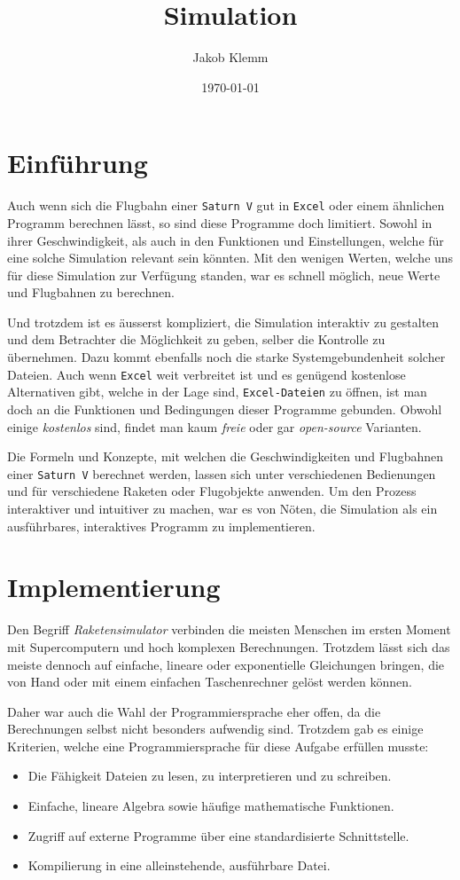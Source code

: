 \documentclass[11pt]{article}
\author{Jakob Klemm}
\date{\today}
\title{Simulation}
\begin{document}
\maketitle
\tableofcontents

\section{Einführung}
\label{sec:org278b65d}
Auch wenn sich die Flugbahn einer \texttt{Saturn V} gut in \texttt{Excel} oder einem ähnlichen
Programm berechnen lässt, so sind diese Programme doch limitiert. Sowohl in
ihrer Geschwindigkeit, als auch in den Funktionen und Einstellungen, welche für
eine solche Simulation relevant sein könnten. Mit den wenigen Werten, welche uns
für diese Simulation zur Verfügung standen, war es schnell möglich, neue Werte
und Flugbahnen zu berechnen.

Und trotzdem ist es äusserst kompliziert, die Simulation interaktiv zu gestalten
und dem Betrachter die Möglichkeit zu geben, selber die Kontrolle zu übernehmen.
Dazu kommt ebenfalls noch die starke Systemgebundenheit solcher Dateien. Auch
wenn \texttt{Excel} weit verbreitet ist und es genügend kostenlose Alternativen gibt,
welche in der Lage sind, \texttt{Excel-Dateien} zu öffnen, ist man doch an die Funktionen
und Bedingungen dieser Programme gebunden. Obwohl einige \emph{kostenlos} sind, findet
man kaum \emph{freie} oder gar \emph{open-source} Varianten.

Die Formeln und Konzepte, mit welchen die Geschwindigkeiten und Flugbahnen einer
\texttt{Saturn V} berechnet werden, lassen sich unter verschiedenen Bedienungen und für
verschiedene Raketen oder Flugobjekte anwenden. Um den Prozess interaktiver und
intuitiver zu machen, war es von Nöten, die Simulation als ein ausführbares,
interaktives Programm zu implementieren.
\section{Implementierung}
\label{sec:orge7180a8}
Den Begriff \emph{Raketensimulator} verbinden die meisten Menschen im ersten Moment mit
Supercomputern und hoch komplexen Berechnungen. Trotzdem lässt sich das meiste
dennoch auf einfache, lineare oder exponentielle Gleichungen bringen, die von
Hand oder mit einem einfachen Taschenrechner gelöst werden können.

Daher war auch die Wahl der Programmiersprache eher offen, da die Berechnungen
selbst nicht besonders aufwendig sind. Trotzdem gab es einige Kriterien, welche
eine Programmiersprache für diese Aufgabe erfüllen musste:
\begin{itemize}
\item Die Fähigkeit Dateien zu lesen, zu interpretieren und zu schreiben.
\item Einfache, lineare Algebra sowie häufige mathematische Funktionen.
\item Zugriff auf externe Programme über eine standardisierte Schnittstelle.
\item Kompilierung in eine alleinstehende, ausführbare Datei.
\end{itemize}
\end{document}
